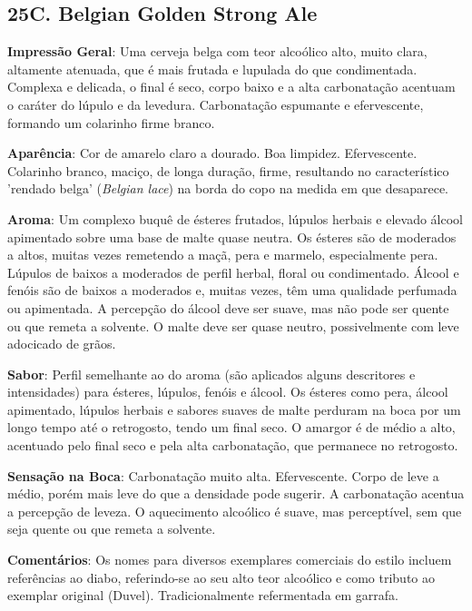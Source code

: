 \subsection*{25C. Belgian Golden Strong Ale}
\textbf{Impressão Geral}: Uma cerveja belga com teor alcoólico alto, muito clara, altamente atenuada, que é mais frutada e lupulada do que condimentada. Complexa e delicada, o final é seco, corpo baixo e a alta carbonatação acentuam o caráter do lúpulo e da levedura. Carbonatação espumante e efervescente, formando um colarinho firme branco.

\textbf{Aparência}: Cor de amarelo claro a dourado. Boa limpidez. Efervescente. Colarinho branco, maciço, de longa duração, firme, resultando no característico 'rendado belga' (\textit{Belgian lace}) na borda do copo na medida em que desaparece.

\textbf{Aroma}: Um complexo buquê de ésteres frutados, lúpulos herbais e elevado álcool apimentado sobre uma base de malte quase neutra. Os ésteres são de moderados a altos, muitas vezes remetendo a maçã, pera e marmelo, especialmente pera. Lúpulos de baixos a moderados de perfil herbal, floral ou condimentado. Álcool e fenóis são de baixos a moderados e, muitas vezes, têm uma qualidade perfumada ou apimentada. A percepção do álcool deve ser suave, mas não pode ser quente ou que remeta a solvente. O malte deve ser quase neutro, possivelmente com leve adocicado de grãos.

\textbf{Sabor}: Perfil semelhante ao do aroma (são aplicados alguns descritores e intensidades) para ésteres, lúpulos, fenóis e álcool. Os ésteres como pera, álcool apimentado, lúpulos herbais e sabores suaves de malte perduram na boca por um longo tempo até o retrogosto, tendo um final seco. O amargor é de médio a alto, acentuado pelo final seco e pela alta carbonatação, que permanece no retrogosto.

\textbf{Sensação na Boca}: Carbonatação muito alta. Efervescente. Corpo de leve a médio, porém mais leve do que a densidade pode sugerir. A carbonatação acentua a percepção de leveza. O aquecimento alcoólico é suave, mas perceptível, sem que seja quente ou que remeta a solvente.

\textbf{Comentários}: Os nomes para diversos exemplares comerciais do estilo incluem referências ao diabo, referindo-se ao seu alto teor alcoólico e como tributo ao exemplar original (Duvel). Tradicionalmente refermentada em garrafa.

